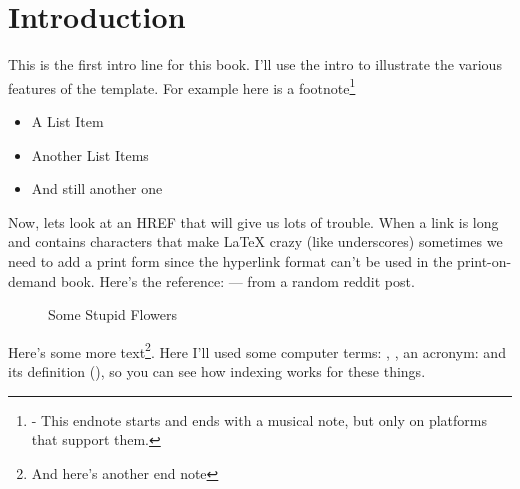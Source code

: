\chapter{Introduction}
\label{intro}%

This is the first intro line for this book. I'll use the intro to illustrate the various features of the template.  For example here is a footnote\footnote{\MusicNote - This endnote starts and ends with a musical note, but only on platforms that support them. \MusicNote}

\begin{itemize}
\item \large{A List Item}
\item \large{Another List Items}
\item \large{And still another one}
\end{itemize}

Now, lets look at an HREF that will give us lots of trouble. When a link is long and contains characters that make LaTeX crazy (like underscores) sometimes we need to add a print form since the hyperlink format can't be used in the print-on-demand book. Here's the reference:  --- from a random reddit post.

\begin{figure}[ht] %
  \centering
  \caption{Some Stupid Flowers} 
  \label{fig:flowerstuff}
\end{figure}

Here's some more text\footnote{And here's another end note}. Here I'll used some computer terms: , , an acronym: \AGI and its definition (), so you can see how indexing works for these things.

